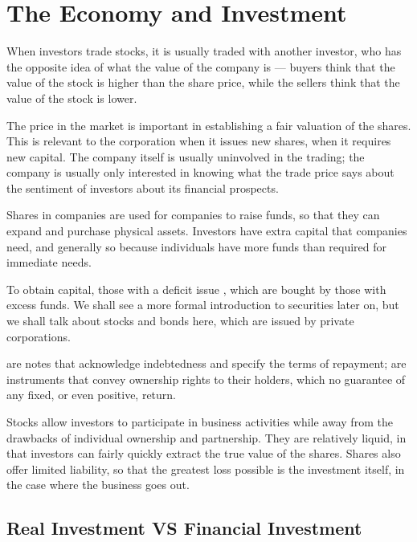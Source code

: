 \documentclass[notoc,notitlepage]{tufte-book}
\begin{document}

\section{The Economy and Investment}%
\label{sec:the_economy_and_investment}

When investors trade stocks, it is usually traded with another investor,
who has the opposite idea of what the value of the company is ---
buyers think that the value of the stock is higher than the share price,
while the sellers think that the value of the stock is lower.

The price in the market is important
in establishing a fair valuation of the shares.
This is relevant to the corporation when it issues new shares,
when it requires new capital.
The company itself is usually uninvolved in the trading;
the company is usually only interested in knowing what the trade price
says about the sentiment of investors about its financial prospects.

Shares in companies are used for companies to raise funds,
so that they can expand and purchase physical assets.
Investors have extra capital that companies need, and generally so
because individuals have more funds than required for immediate needs.

To obtain capital, those with a deficit issue ,
which are bought by those with excess funds.
We shall see a more formal introduction to securities later on,
but we shall talk about stocks and bonds here, which are issued by
private corporations.

 are notes that acknowledge indebtedness and specify
the terms of repayment;  are instruments that convey
ownership rights to their holders,
which no guarantee of any fixed, or even positive, return.

Stocks allow investors to participate in business activities
while away from the drawbacks of individual ownership and partnership.
They are relatively liquid, in that investors can fairly quickly
extract the true value of the shares.
Shares also offer limited liability, so that the greatest loss possible
is the investment itself, in the case where the business goes out.

\subsection{Real Investment VS Financial Investment}%
\label{sub:real_investment_vs_financial_investment}
\end{document}
